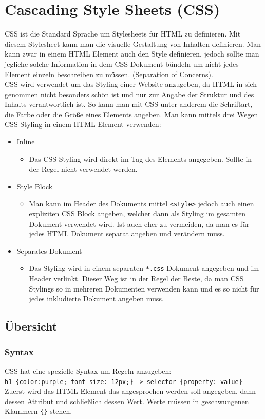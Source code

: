 \documentclass{article}
\begin{document}
	\section{Cascading Style Sheets (CSS)}
	CSS ist die Standard Sprache um Stylesheets für HTML zu definieren. Mit diesem Stylesheet kann man die visuelle Gestaltung von Inhalten definieren. Man kann zwar in einem HTML Element auch den Style definieren, jedoch sollte man jegliche solche Information in dem CSS Dokument bündeln um nicht jedes Element einzeln beschreiben zu müssen. (Separation of Concerns). \\
	CSS wird verwendet um das Styling einer Website anzugeben, da HTML in sich genommen nicht besonders schön ist und nur zur Angabe der Struktur und des Inhalts verantwortlich ist. So kann man mit CSS unter anderem die Schriftart, die Farbe oder die Größe eines Elements angeben. Man kann mittels drei Wegen CSS Styling in einem HTML Element verwenden:
	\begin{itemize}
		\item{Inline}
		\begin{itemize}
			\item{Das CSS Styling wird direkt im Tag des Elements angegeben. Sollte in der Regel nicht verwendet werden.}
		\end{itemize}
		\item{Style Block}
		\begin{itemize}
			\item{Man kann im Header des Dokuments mittel \texttt{<style>} jedoch auch einen expliziten CSS Block angeben, welcher dann als Styling im gesamten Dokument verwendet wird. Ist auch eher zu vermeiden, da man es für jedes HTML Dokument separat angeben und verändern muss.}
		\end{itemize}
		\item{Separates Dokument}
		\begin{itemize}
			\item{Das Styling wird in einem separaten \texttt{*.css} Dokument angegeben und im Header verlinkt. Dieser Weg ist in der Regel der Beste, da man CSS Stylings so in mehreren Dokumenten verwenden kann und es so nicht für jedes inkludierte Dokument angeben muss.}
		\end{itemize}
	\end{itemize}
	\subsection{Übersicht}
	\subsubsection{Syntax}
	CSS hat eine spezielle Syntax um Regeln anzugeben: \\
	\texttt{h1 \{color:purple; font-size: 12px;\}} \texttt{-> selector \{property: value\}} \\
	Zuerst wird das HTML Element das angesprochen werden soll angegeben, dann dessen Attribut und schließlich dessen Wert. Werte müssen in geschwungenen Klammern \texttt{\{\}} stehen. \\
\end{document}
